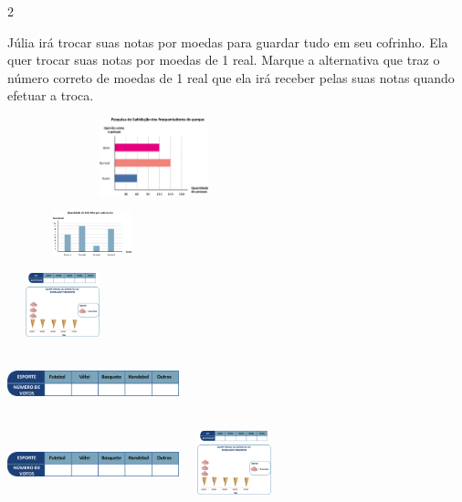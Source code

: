\begin{escolha}
{\begin{escolha}
\num{2}

Júlia irá trocar suas notas por moedas para guardar tudo em seu
cofrinho. Ela quer trocar suas notas por moedas de 1 real. Marque a
alternativa que traz o número correto de moedas de 1 real que ela
irá receber pelas suas notas quando efetuar a troca.


\includegraphics[width=3.34196in,height=0.88341in]{media/image82.png}

\begin{escolha}

\item
\includegraphics[width=1.93350in,height=0.50004in]{media/image83.png}

\item
\includegraphics[width=1.26678in,height=0.72506in]{media/image84.png}

\item
\includegraphics[width=1.95850in,height=0.69173in]{media/image85.png}

\item
\includegraphics[width=1.95850in,height=0.69173in]{media/image85.png}\includegraphics[width=1.26678in,height=0.72506in]{media/image84.png}
\end{escolha}


\end{escolha}}
\end{escolha}
